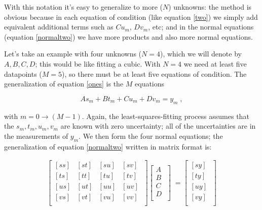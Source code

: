 \documentclass[psfig,preprint]{aastex}
\begin{document}
	With this notation it's easy to generalize to more ($N$)
unknowns: the method is obvious because in each equation of condition
(like equation \ref{two}) we simply add equivalent additional terms such
as $C u_m$, $D v_m$, etc; and in the normal equations (equation
\ref{normaltwo}) we have more products and also more normal equations. 

	Let's take an example with four unknowns ($N=4$), which we will
denote by $A, B, C, D$; this would be like fitting a cubic.  With $N=4$
we need at least five datapoints ($M=5$), so there must be at least
five equations of condition.  The generalization of equation \ref{ones}
is the $M$ equations

\begin{equation} \label{eqcond}
A s_m + B t_m + C u_m + D v_m = y_m \; ,
\end{equation}

\noindent with $m = 0 \rightarrow (M-1)$.  Again, the
least-squares-fitting process assumes that the $s_m, t_m, u_m, v_m$ are
known with zero uncertainty; all of the uncertainties are in the
measurements of $y_m$.  We then form the four normal equations; the
generalization of equation \ref{normaltwo} written in matrix format is:

\begin{eqnarray} \label{smeqn} 
\left[ 
\begin{array}{cccc} 
{[ ss ]} & {[ st ]} & {[ su ]} & {[ sv ]} \\ 
{[ ts ]} & {[ tt ]} & {[ tu ]} & {[ tv ]} \\ 
{[ us ]} & {[ ut ]} & {[ uu ]} & {[ uv ]} \\ 
{[ vs ]} & {[ vt ]} & {[ vu ]} & {[ vv ]} \\
\end{array} 
\; \right] 
\left[ 
\begin{array}{c} 
A \\ 
B \\ 
C \\ 
D \\
\end{array} 
\; \right] 
\; = 
\left[ 
\begin{array}{c} 
{[ s y ]} \\ 
{[ t y ]} \\ 
{[ u y ]} \\ 
{[ v y ]} \\ 
\end{array} 
\; \right]
\end{eqnarray} 
\end{document}
